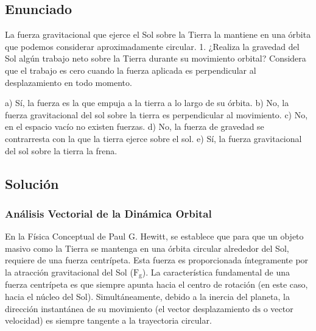 \documentclass[a4paper,12pt]{article}
\begin{document}
\newpage

\subsection*{Enunciado}
La fuerza gravitacional que ejerce el Sol sobre la Tierra la mantiene en una órbita que podemos considerar aproximadamente circular. 
1. ¿Realiza la gravedad del Sol algún trabajo neto sobre la Tierra durante su movimiento orbital? Considera que el trabajo es cero cuando la fuerza aplicada es perpendicular al desplazamiento en todo momento.

a) Sí, la fuerza es la que empuja a la tierra a lo largo de su órbita.
b) No, la fuerza gravitacional del sol sobre la tierra es perpendicular al movimiento.
c) No, en el espacio vacío no existen fuerzas.
d) No, la fuerza de gravedad se contrarresta con la que la tierra ejerce sobre el sol.
e) Sí, la fuerza gravitacional del sol sobre la tierra la frena.

\begin{center}
\end{center}

\subsection*{Solución}

\subsubsection*{Análisis Vectorial de la Dinámica Orbital}
En la Física Conceptual de Paul G. Hewitt, se establece que para que un objeto masivo como la Tierra se mantenga en una órbita circular alrededor del Sol, requiere de una fuerza centrípeta. Esta fuerza es proporcionada íntegramente por la atracción gravitacional del Sol ($\text{F}_\text{g}$). La característica fundamental de una fuerza centrípeta es que siempre apunta hacia el centro de rotación (en este caso, hacia el núcleo del Sol). 
Simultáneamente, debido a la inercia del planeta, la dirección instantánea de su movimiento (el vector desplazamiento $\text{ds}$ o vector velocidad) es siempre tangente a la trayectoria circular.
\end{document}
